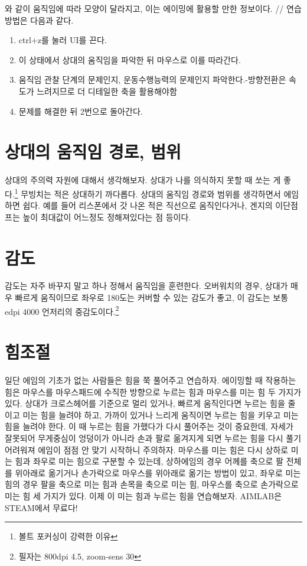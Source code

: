 와 같이 움직임에 따라 모양이 달라지고, 이는 에이밍에 활용할 만한 정보이다. //
연습 방법은 다음과 같다.
\begin{enumerate}
    \item ctrl+z를 눌러 UI를 끈다.
    \item 이 상태에서 상대의 움직임을 파악한 뒤 마우스로 이를 따라간다.
    \item 움직임 관찰 단계의 문제인지, 운동수행능력의 문제인지 파악한다.-방향전환은 속도가 느려지므로 더 디테일한 축을 활용해야함
    \item 문제를 해결한 뒤 2번으로 돌아간다.
\end{enumerate}

\section{상대의 움직임 경로, 범위}
상대의 주의력 자원에 대해서 생각해보자. 상대가 나를 의식하지 못할 때 쏘는 게 좋다.\footnote{볼트 포커싱이 강력한 이유} 무빙치는 적은 상대하기 까다롭다. 상대의 움직임 경로와 범위를 생각하면서 에임하면 쉽다. 예를 들어 리스폰에서 갓 나온 적은 직선으로 움직인다거나, 겐지의 이단점프는 높이 최대값이 어느정도 정해져있다는 점 등이다.


\section{감도}
감도는 자주 바꾸지 말고 하나 정해서 움직임을 훈련한다. 오버워치의 경우, 상대가 매우 빠르게 움직이므로 좌우로 180도는 커버할 수 있는 감도가 좋고, 이 감도는 보통 edpi 4000 언저리의 중감도이다.\footnote{필자는 800dpi 4.5, zoom-sens 30}

\section{힘조절}
일단 에임의 기초가 없는 사람들은 힘을 쭉 풀어주고 연습하자. 에이밍할 때 작용하는 힘은 마우스를 마우스패드에 수직한 방향으로 누르는 힘과 마우스를 미는 힘 두 가지가 있다. 상대가 크로스헤어를 기준으로 멀리 있거나, 빠르게 움직인다면 누르는 힘을 줄이고 미는 힘을 늘려야 하고, 가까이 있거나 느리게 움직이면 누르는 힘을 키우고 미는 힘을 늘려야 한다. 이 때 누르는 힘을 가했다가 다시 풀어주는 것이 중요한데, 자세가 잘못되어 무게중심이 엉덩이가 아니라 손과 팔로 옮겨지게 되면 누르는 힘을 다시 풀기 어려워져 에임이 점점 안 맞기 시작하니 주의하자. 마우스를 미는 힘은 다시 상하로 미는 힘과 좌우로 미는 힘으로 구분할 수 있는데, 상하에임의 경우 어께를 축으로 팔 전체를 위아래로 옮기거나 손가락으로 마우스를 위아래로 옮기는 방법이 있고, 좌우로 미는 힘의 경우 팔을 축으로 미는 힘과 손목을 축으로 미는 힘, 마우스를 축으로 손가락으로 미는 힘 세 가지가 있다. 이제 이 미는 힘과 누르는 힘을 연습해보자. AIMLAB은 STEAM에서 무료다!

